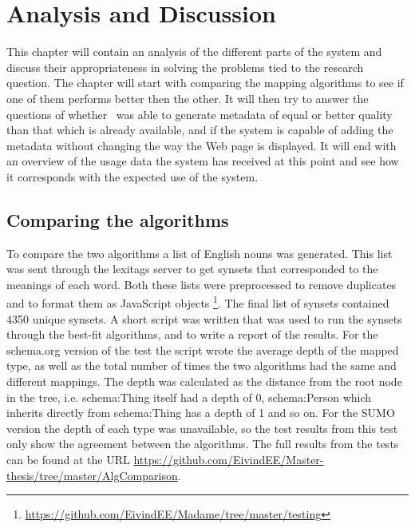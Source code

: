 
\chapter{Analysis and Discussion} %

\label{AnalysisAndDiscussion}


This chapter will contain an analysis of the different parts of the system and discuss their appropriateness in solving the
problems tied to the research question.
The chapter will start with comparing the mapping algorithms to see if one of them performs better then the other.
It will then try to answer the questions of whether \theartefact\ was able to generate metadata of equal or better quality than that
which is already available, and if the system is capable of adding the metadata without changing the way the Web page is displayed.
It will end with an overview of the usage data the system has received at this point and see how it corresponds with the expected use of the system.

\section{Comparing the algorithms}
\label{ComparingAlgorithms}
To compare the two algorithms a list of English nouns was generated.
This list was sent through the lexitags server to get synsets that corresponded to the meanings of each word.
Both these lists were preprocessed to remove duplicates and to format them as JavaScript objects
\footnote{\url{https://github.com/EivindEE/Madame/tree/master/testing}}.
The final list of synsets contained 4350 unique synsets.
A short script was written that was used to run the synsets through the best-fit algorithms,
and to write a report of the results.
For the schema.org version of the test the script wrote the average depth of the mapped type,
as well as the total number of times the two algorithms had the same and different mappings.
The depth was calculated as the distance from the root node in the tree,
i.e. schema:Thing itself had a depth of 0,
schema:Person which inherits directly from schema:Thing has a depth of 1 and so on.
For the SUMO version the depth of each type was unavailable,
so the test results from this test only show the agreement between the algorithms.
The full results from the tests can be found at the URL \url{https://github.com/EivindEE/Master-thesis/tree/master/AlgComparison}.

